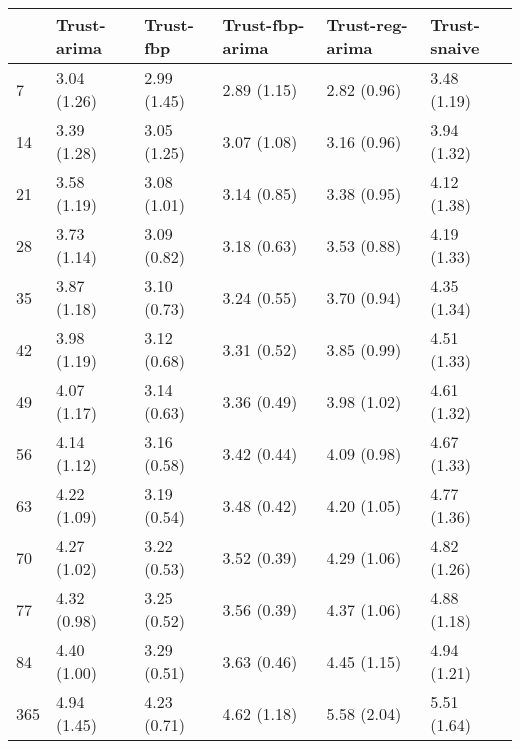 \begin{tabular}{llllll}
\toprule
{} &  Trust-arima &    Trust-fbp & Trust-fbp-arima & Trust-reg-arima & Trust-snaive \\
\midrule
7   &  3.04 (1.26) &  2.99 (1.45) &     2.89 (1.15) &     2.82 (0.96) &  3.48 (1.19) \\
14  &  3.39 (1.28) &  3.05 (1.25) &     3.07 (1.08) &     3.16 (0.96) &  3.94 (1.32) \\
21  &  3.58 (1.19) &  3.08 (1.01) &     3.14 (0.85) &     3.38 (0.95) &  4.12 (1.38) \\
28  &  3.73 (1.14) &  3.09 (0.82) &     3.18 (0.63) &     3.53 (0.88) &  4.19 (1.33) \\
35  &  3.87 (1.18) &  3.10 (0.73) &     3.24 (0.55) &     3.70 (0.94) &  4.35 (1.34) \\
42  &  3.98 (1.19) &  3.12 (0.68) &     3.31 (0.52) &     3.85 (0.99) &  4.51 (1.33) \\
49  &  4.07 (1.17) &  3.14 (0.63) &     3.36 (0.49) &     3.98 (1.02) &  4.61 (1.32) \\
56  &  4.14 (1.12) &  3.16 (0.58) &     3.42 (0.44) &     4.09 (0.98) &  4.67 (1.33) \\
63  &  4.22 (1.09) &  3.19 (0.54) &     3.48 (0.42) &     4.20 (1.05) &  4.77 (1.36) \\
70  &  4.27 (1.02) &  3.22 (0.53) &     3.52 (0.39) &     4.29 (1.06) &  4.82 (1.26) \\
77  &  4.32 (0.98) &  3.25 (0.52) &     3.56 (0.39) &     4.37 (1.06) &  4.88 (1.18) \\
84  &  4.40 (1.00) &  3.29 (0.51) &     3.63 (0.46) &     4.45 (1.15) &  4.94 (1.21) \\
365 &  4.94 (1.45) &  4.23 (0.71) &     4.62 (1.18) &     5.58 (2.04) &  5.51 (1.64) \\
\bottomrule
\end{tabular}
